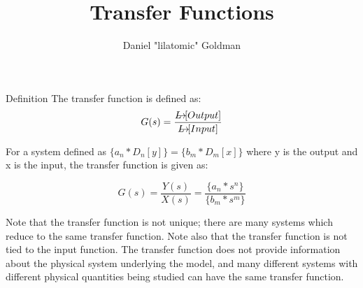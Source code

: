 \documentclass{../templates/topic}
\title{Transfer Functions}
\author{Daniel "lilatomic" Goldman}
\begin{document}
\begin{section}{Definition}
	The transfer function is defined as:
	\begin{equation}
		G(s) = \frac{\laplace[Output]}{\laplace[Input]}
	\end{equation}
	
	For a system defined as $\{a_{n}*D_{n}[y] \} = \{b_{m}*D_{m}[x] \}$ where y is the output and x is the input, the transfer function is given as:
	
	\begin{equation}
		G(s) = \frac{Y(s)}{X(s)} = \frac{\{a_{n}*s^{n}\}}{\{b_{m}*s^{m}\}}
	\end{equation}
	
	Note that the transfer function is not unique; there are many systems which reduce to the same transfer function.
	Note also that the transfer function is not tied to the input function.
	The transfer function does not provide information about the physical system underlying the model, and many different systems with different physical quantities being studied can have the same transfer function.
	
\end{section}
\end{document}

